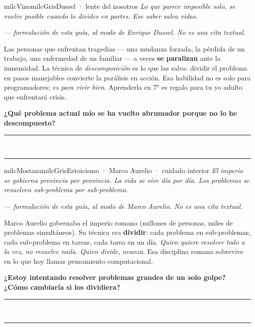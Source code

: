 \documentclass[11pt,letterpaper]{article}
\newcommand{\linead}[1]{\noindent\color{milcLinea}\rule{#1}{0.5pt}\color{milcNegro}}
\begin{document}
\begin{softbox}{milcVino}{milcGris}{Dussel · lente del nosotros}
\textit{Lo que parece imposible solo, se vuelve posible cuando lo divides en partes. Ese saber salva vidas.}

{\footnotesize\itshape\color{milcNegro!70}--- formulación de esta guía, al modo de Enrique Dussel. No es una cita textual.}

Las personas que enfrentan tragedias --- una mudanza forzada, la pérdida de un trabajo, una enfermedad de un familiar --- a veces \textbf{se paralizan} ante la inmensidad. La técnica de \emph{descomposición} es lo que las salva: dividir el problema en pasos manejables convierte la parálisis en acción. Esa habilidad no es solo para programadores; \emph{es para vivir bien}. Aprenderla en 7° es regalo para tu yo adulto que enfrentará crisis.

\textbf{¿Qué problema actual mío se ha vuelto abrumador porque no lo he descompuesto?}
\end{softbox}
\linead{\linewidth}\\[1mm]
\linead{\linewidth}

\begin{softbox}{milcMostaza}{milcGris}{Estoicismo · Marco Aurelio · cuidado interior}
\textit{El imperio se gobierna provincia por provincia. La vida se vive día por día. Los problemas se resuelven sub-problema por sub-problema.}

{\footnotesize\itshape\color{milcNegro!70}--- formulación de esta guía, al modo de Marco Aurelio. No es una cita textual.}

Marco Aurelio gobernaba el imperio romano (millones de personas, miles de problemas simultáneos). Su técnica era \textbf{dividir}: cada problema en sub-problemas, cada sub-problema en tareas, cada tarea en un día. \emph{Quien quiere resolver todo a la vez, no resuelve nada. Quien divide, avanza}. Esa disciplina romana sobrevive en lo que hoy llamas pensamiento computacional.

\textbf{¿Estoy intentando resolver problemas grandes de un solo golpe? ¿Cómo cambiaría si los dividiera?}
\end{softbox}
\linead{\linewidth}\\[1mm]
\linead{\linewidth}
\end{document}
